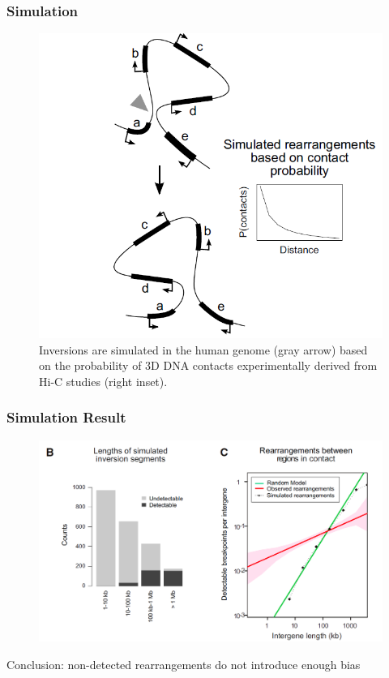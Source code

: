 \documentclass[svgnames,14pt]{beamer}
\begin{document}
\begin{frame}
\frametitle{Simulation}
\begin{figure}
	\centering
	\includegraphics[scale = .40]{Simulation.png}
\caption{Inversions are simulated in the human genome (gray arrow) based on the probability of 3D DNA contacts experimentally derived from Hi-C studies (right inset).}
\end{figure}
\end{frame}

\begin{frame}
\frametitle{Simulation Result}
\begin{figure}
	\centering
	\includegraphics[scale = .31]{SimResult.png}
\end{figure}
Conclusion: non-detected rearrangements do not introduce enough bias
\end{frame}
\end{document}

